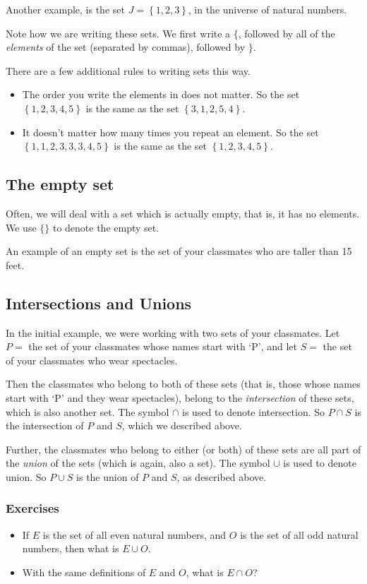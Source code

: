 \documentclass{article}
\begin{document}
Another example, is the set $J = \left\{1, 2, 3\right\}$, in the universe of natural numbers.

Note how we are writing these sets. We first write a $\{$, followed by all
of the \emph{elements} of the set (separated by commas), followed by $\}$.

There are a few additional rules to writing sets this way.
\begin{itemize}
	\item The order you write the elements in does not matter.
		So the set $\left\{1, 2, 3, 4, 5\right\}$ is the same
		as the set $\left\{3, 1, 2, 5, 4\right\}$.
	\item It doesn't matter how many times you repeat an element.
		So the set $\left\{1, 1, 2, 3, 3, 3, 4, 5\right\}$ is the
		same as the set $\left\{1, 2, 3, 4, 5\right\}$.
\end{itemize}

\subsection{The empty set}
Often, we will deal with a set which is actually empty, that is, it has
no elements. We use $\{\}$ to denote the empty set.

An example of an empty set is the set of your classmates who are taller
than 15 feet.

\subsection{Intersections and Unions}
In the initial example, we were working with two sets of your classmates.
Let $P = $ the set of your classmates whose names start with `P', and let
$S = $ the set of your classmates who wear spectacles.

Then the classmates who belong to both of these sets (that is, those whose names start
with `P' and they wear spectacles), belong to the \emph{intersection} of 
these sets, which is also another set.
The symbol $\cap$ is used to denote intersection.
So $P \cap S$ is the intersection of $P$ and $S$, which we described above.

Further, the classmates who belong to either (or both) of these sets are all part
of the \emph{union} of the sets (which is again, also a set).
The symbol $\cup$ is used to denote union.
So $P \cup S$ is the union of $P$ and $S$, as described above.

\subsubsection{Exercises}
\begin{itemize}
	\item If $E$ is the set of all even natural numbers, and $O$ is the set of
	all odd natural numbers, then what is $E \cup O$.
	\item With the same definitions of $E$ and $O$, what is $E \cap O$?
\end{itemize}
\end{document}
